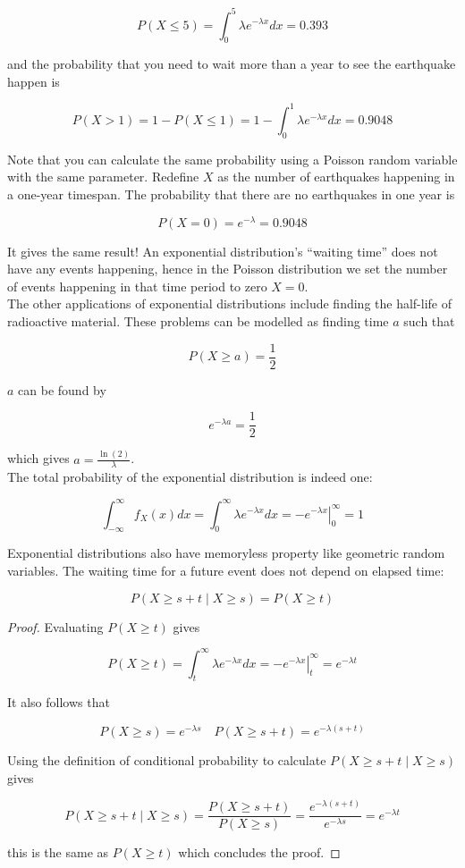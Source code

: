 \documentclass[12pt, a4paper]{article}
\begin{document}
$$P(X\le5)=\int_0^5\lambda e^{-\lambda x}dx=0.393$$

and the probability that you need to wait more than a year to see the earthquake happen is

$$P(X>1)=1-P(X\le1)=1-\int_0^1\lambda e^{-\lambda x}dx=0.9048$$

Note that you can calculate the same probability using a Poisson random variable with the same parameter. Redefine $X$ as the number of earthquakes happening in a one-year timespan. The probability that there are no earthquakes in one year is

$$P(X=0)=e^{-\lambda}=0.9048$$

It gives the same result! An exponential distribution's ``waiting time'' does not have any events happening, hence in the Poisson distribution we set the number of events happening in that time period to zero $X=0$. \\

The other applications of exponential distributions include finding the half-life of radioactive material. These problems can be modelled as finding time $a$ such that

$$P(X\ge a)=\frac12$$

$a$ can be found by

$$e^{-\lambda a}=\frac12$$

which gives $a=\frac{\ln(2)}{\lambda}$. \\

The total probability of the exponential distribution is indeed one:

$$\int_{-\infty}^\infty f_X(x) dx = \int_0^\infty \lambda e^{-\lambda x} dx = \left. -e^{-\lambda x} \right\vert_0^\infty = 1$$

Exponential distributions also have memoryless property like geometric random variables. The waiting time for a future event does not depend on elapsed time:

$$P(X\ge s+t \mid X\ge s)=P(X\ge t)$$

\begin{proof}
Evaluating $P(X\ge t)$ gives

$$P(X\ge t)=\int_t^\infty \lambda e^{-\lambda x} dx = \left. -e^{-\lambda x} \right\vert_t^\infty = e^{-\lambda t}$$

It also follows that

$$P(X\ge s)=e^{-\lambda s} \quad P(X\ge s+t)=e^{-\lambda (s+t)}$$

Using the definition of conditional probability to calculate $P(X\ge s+t \mid X\ge s)$ gives

$$P(X\ge s+t \mid X\ge s)=\frac{P(X\ge s+t)}{P(X\ge s)}=\frac{e^{-\lambda (s+t)}}{e^{-\lambda s}}=e^{-\lambda t}$$

this is the same as $P(X\ge t)$ which concludes the proof.
\end{proof}
\end{document}
